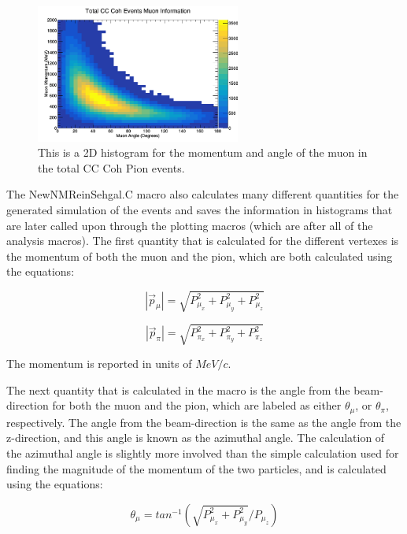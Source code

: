 \documentclass[11pt]{article}
\begin{document}
\begin{figure}[H]
\centering
\includegraphics[width=0.6\textwidth]{NewNMReinSehgalImages/9-TotalCCCohMuonInfoNMRS.png}
\caption{This is a 2D histogram for the momentum and angle of the muon in the total CC Coh Pion events.}
\end{figure}

The NewNMReinSehgal.C macro also calculates many different quantities for the generated simulation of the events and saves the information in histograms that are later called upon through the plotting macros (which are after all of the analysis macros). The first quantity that is calculated for the different vertexes is the momentum of both the muon and the pion, which are both calculated using the equations:

\begin{equation}
|\vec{p}_\mu| = \sqrt{P_{\mu_x}^2 + P_{\mu_y}^2 + P_{\mu_z}^2}
\end{equation}

\begin{equation}
|\vec{p}_\pi| = \sqrt{P_{\pi_x}^2 + P_{\pi_y}^2 + P_{\pi_z}^2}
\end{equation}

\noindent
The momentum is reported in units of $MeV/c$.

The next quantity that is calculated in the macro is the angle from the beam-direction for both the muon and the pion, which are labeled as either $\theta_\mu$, or $\theta_\pi$, respectively. The angle from the beam-direction is the same as the angle from the z-direction, and this angle is known as the azimuthal angle. The calculation of the azimuthal angle is slightly more involved than the simple calculation used for finding the magnitude of the momentum of the two particles, and is calculated using the equations:

\begin{equation}
\theta_\mu = tan^{-1}(\sqrt{P_{\mu_x}^2 + P_{\mu_y}^2}/{P_{\mu_z}})
\end{equation}
\end{document}
